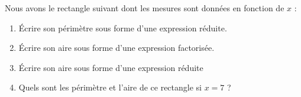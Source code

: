 
\begin{exercice}\label{exosmath-0805}

    Nous avons le rectangle suivant dont les mesures sont données en fonction de \( x\) :

\begin{center}
   
\end{center}

\begin{enumerate}
    \item
        Écrire son périmètre sous forme d'une expression réduite.
    \item
        Écrire son aire sous forme d'une expression factorisée.
    \item
        Écrire son aire sous forme d'une expression réduite
    \item
        Quels sont les périmètre et l'aire de ce rectangle si \( x=7\) ?
\end{enumerate}

\end{exercice}

